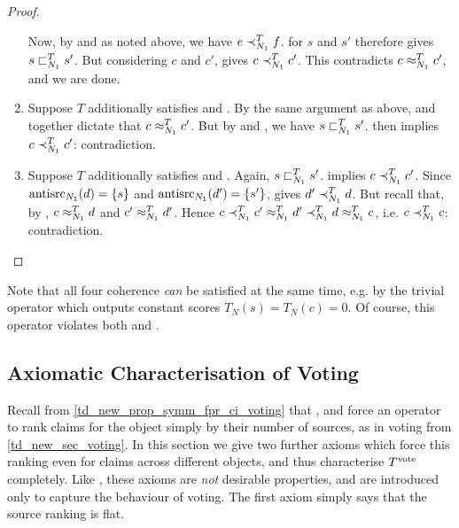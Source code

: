 \begin{proof}
\begin{enumerate}
              Now, by \freshposresp{} and \symmetry{} as noted above, we have
              $e \prec_{N_1}^T f$. \sourcecoherence{} for $s$ and $s'$ therefore
              gives $s \sqsubset_{N_1}^T s'$. But considering $c$ and $c'$,
              \claimcoherence{} gives $c \prec_{N_1}^T c'$. This contradicts $c
              \approx_{N_1}^T c'$, and we are done.

        \item Suppose $T$ additionally satisfies \sourceposresp{} and
              \conflictcoherence{}. By the same argument as above,
              \conflictcoherence{} and \symmetry{} together dictate that $c
              \approx_{N_1}^T c'$. But by \symmetry{} and \sourceposresp{}, we
              have $s \sqsubset_{N_1}^T s'$. \claimcoherence{} then implies $c
              \prec_{N_1}^T c'$: contradiction.

        \item Suppose $T$ additionally satisfies \sourceposresp{} and
              \anticoherence{}. Again, $s \sqsubset_{N_1}^T s'$. \claimcoherence{}
              implies $c \prec_{N_1}^T c'$. Since $\operatorname{antisrc}_{N_1}(d) = \{s\}$
              and $\operatorname{antisrc}_{N_1}(d') = \{s'\}$, \anticoherence{} gives $d'
              \prec_{N_1}^T d$. But recall that, by \symmetry{}, $c \approx_{N_1}^T
              d$ and $c' \approx_{N_1}^T d'$. Hence $c \prec_{N_1}^T c'
              \approx_{N_1}^T d' \prec_{N_1}^T d \approx_{N_1}^T c$, i.e. $c
              \prec_{N_1}^T c$: contradiction.
    \end{enumerate}
\end{proof}

Note that all four coherence \emph{can} be satisfied at the same time, e.g. by
the trivial operator which outputs constant scores $T_N(s) = T_N(c) = 0$. Of
course, this operator violates both \freshposresp{} and \sourceposresp{}.

\subsection{Axiomatic Characterisation of Voting}
\label{td_new_sec_a_characterisation_of_voting}

Recall from \cref{td_new_prop_symm_fpr_ci_voting} that \symmetry{},
\freshposresp{} and \classicalindependence{} force an operator to rank claims
for the object simply by their number of sources, as in voting from
\cref{td_new_sec_voting}. In this section we give two further axioms which
force this ranking even for claims across different objects, and thus
characterise $T^{\operatorname{vote}}{}$ completely. Like \classicalindependence{}, these
axioms are \emph{not} desirable properties, and are introduced only to capture
the behaviour of voting. The first axiom simply says that the source ranking is
flat.

